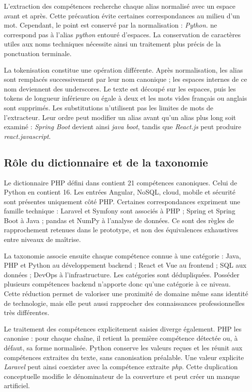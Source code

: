 L'extraction des compétences recherche chaque alias normalisé avec un espace avant et après. Cette précaution évite certaines correspondances au milieu d'un mot. Cependant, le point est conservé par la normalisation : \emph{Python.} ne correspond pas à l'alias \emph{python} entouré d'espaces. La conservation de caractères utiles aux noms techniques nécessite ainsi un traitement plus précis de la ponctuation terminale.

La tokenisation constitue une opération différente. Après normalisation, les alias sont remplacés successivement par leur nom canonique ; les espaces internes de ce nom deviennent des underscores. Le texte est découpé sur les espaces, puis les tokens de longueur inférieure ou égale à deux et les mots vides français ou anglais sont supprimés. Les substitutions n'utilisent pas les limites de mots de l'extracteur. Leur ordre peut modifier un alias avant qu'un alias plus long soit examiné : \emph{Spring Boot} devient ainsi \emph{java boot}, tandis que \emph{React.js} peut produire \emph{react.javascript}.

\subsection{Rôle du dictionnaire et de la taxonomie}

Le dictionnaire PHP défini dans  contient 21 compétences canoniques. Celui de Python en contient 16. Les entrées Angular, NoSQL, cloud, mobile et sécurité sont présentes uniquement côté PHP. Certaines correspondances expriment une famille technique : Laravel et Symfony sont associés à PHP ; Spring et Spring Boot à Java ; pandas et NumPy à l'analyse de données. Ce sont des règles de rapprochement retenues dans le prototype, et non des équivalences exhaustives entre niveaux de maîtrise.

La taxonomie associe ensuite chaque compétence connue à une catégorie : Java, PHP et Python au développement backend ; React et Vue au frontend ; SQL aux données ; DevOps à l'infrastructure. Les catégories sont dédupliquées. Posséder plusieurs compétences backend n'apporte donc qu'une catégorie à ce niveau. Cette réduction permet de valoriser une proximité de domaine même sans identité de technologie, mais elle peut aussi rapprocher des connaissances professionnelles très différentes.

Le traitement des compétences explicitement saisies diverge également. PHP les canonise : pour chaque chaîne, il retient la première compétence détectée ou, à défaut, sa forme normalisée. Python conserve les valeurs reçues et les réunit aux compétences extraites du texte, sans canonisation préalable. Une valeur explicite \emph{Laravel} peut ainsi coexister avec la compétence extraite \emph{php}. Cette duplication conceptuelle modifie le dénominateur de la couverture et peut créer un manque artificiel.

